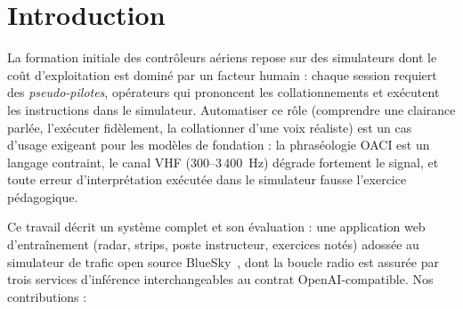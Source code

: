 \documentclass[10pt,a4paper]{article}
\begin{document}
\section{Introduction}

La formation initiale des contrôleurs aériens repose sur des simulateurs dont
le coût d'exploitation est dominé par un facteur humain : chaque session
requiert des \emph{pseudo-pilotes}, opérateurs qui prononcent les
collationnements et exécutent les instructions dans le simulateur. Automatiser ce rôle (comprendre une clairance parlée, l'exécuter fidèlement, la collationner d'une voix réaliste) est un cas d'usage exigeant pour les
modèles de fondation : la phraséologie OACI est un langage contraint, le canal
VHF (300--3\,400~Hz) dégrade fortement le signal, et toute erreur
d'interprétation exécutée dans le simulateur fausse l'exercice pédagogique.

Ce travail décrit un système complet et son évaluation : une application web
d'entraînement (radar, strips, poste instructeur, exercices notés) adossée au
simulateur de trafic open source BlueSky~\cite{bluesky}, dont la boucle radio
est assurée par trois services d'inférence interchangeables au contrat
OpenAI-compatible. Nos contributions :
\end{document}
